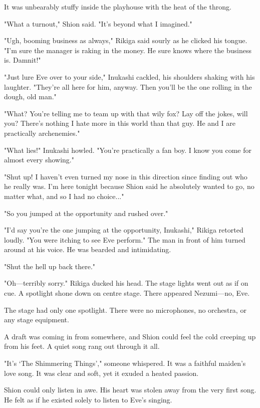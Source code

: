\myspace

It was unbearably stuffy inside the playhouse with the heat of the throng.

"What a turnout," Shion said. "It's beyond what I imagined."

"Ugh, booming business as always," Rikiga said sourly as he clicked his tongue. "I'm sure the manager is raking in the money. He sure knows where the business is. Damnit!"

"Just lure Eve over to your side," Inukashi cackled, his shoulders shaking with his laughter. "They're all here for him, anyway. Then you'll be the one rolling in the dough, old man."

"What? You're telling me to team up with that wily fox? Lay off the jokes, will you? There's nothing I hate more in this world than that guy. He and I are practically archenemies."

"What lies!" Inukashi howled. "You're practically a fan boy. I know you come for almost every showing."

"Shut up! I haven't even turned my nose in this direction since finding out who he really was. I'm here tonight because Shion said he absolutely wanted to go, no matter what, and so I had no choice..."

"So you jumped at the opportunity and rushed over."

"I'd say you're the one jumping at the opportunity, Inukashi," Rikiga retorted loudly. "You were itching to see Eve perform." The man in front of him turned around at his voice. He was bearded and intimidating.

"Shut the hell up back there."

"Oh---terribly sorry." Rikiga ducked his head. The stage lights went out as if on cue. A spotlight shone down on centre stage. There appeared Nezumi---no, Eve.

The stage had only one spotlight. There were no microphones, no orchestra, or any stage equipment.

A draft was coming in from somewhere, and Shion could feel the cold creeping up from his feet. A quiet song rang out through it all.

"It's ‘The Shimmering Things'," someone whispered. It was a faithful maiden's love song. It was clear and soft, yet it exuded a heated passion.

Shion could only listen in awe. His heart was stolen away from the very first song. He felt as if he existed solely to listen to Eve's singing.

